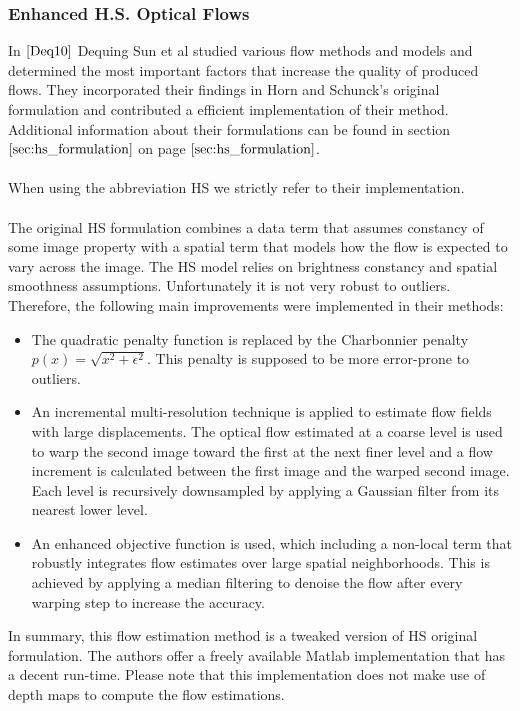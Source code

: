 

\subsubsection{Enhanced H.S. Optical Flows}
In $\cite{Deq10}$ Dequing Sun et al studied various flow methods and models and determined the most important factors that increase the quality of produced flows. They incorporated their findings in Horn and Schunck's original formulation and contributed a efficient implementation of their method. Additional information about their formulations can be found in section $\ref{sec:hs_formulation}$ on page $\pageref{sec:hs_formulation}$. \\ \\
When using the abbreviation HS we strictly refer to their implementation. \\ \\
The original HS formulation combines a data term that assumes constancy of some image property with a spatial term that models how the flow is expected to vary across the image. The HS model relies on brightness constancy and spatial smoothness assumptions. Unfortunately it is not very robust to outliers. Therefore, the following main improvements were implemented in their methods:
\begin{itemize}
  \item The quadratic penalty function is replaced by the Charbonnier penalty $p\left( x \right) = \sqrt{x^2 + \epsilon^2}$. This penalty is supposed to be more error-prone to outliers.
  \item An incremental multi-resolution technique is applied to estimate flow fields with large displacements. The optical flow estimated at a coarse level is used to warp the second image toward the first at the next finer level and a flow increment is calculated between the first image and the warped second image. Each level is recursively downsampled by applying a Gaussian filter from its nearest lower level.
  \item An enhanced objective function is used, which including a non-local term that robustly integrates flow estimates over large spatial neighborhoods. This is achieved by applying a median filtering to denoise the flow after every warping step to increase the accuracy.
\end{itemize}
In summary, this flow estimation method is a tweaked version of HS original formulation. The authors offer a freely available Matlab implementation that has a decent run-time. Please note that this implementation does not make use of depth maps to compute the flow estimations.

